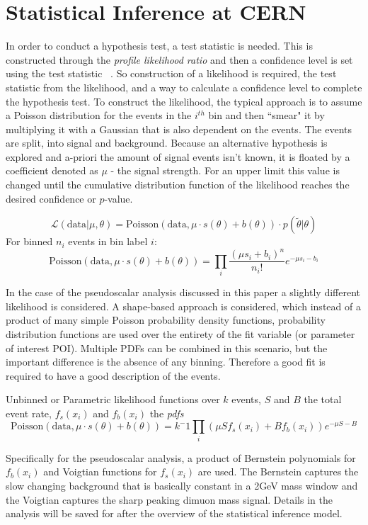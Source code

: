 \section{Statistical Inference at CERN}
In order to conduct a hypothesis test, a test statistic is needed. This is constructed through the \textit{profile likelihood ratio} and then a confidence level is set using the test statistic ~\cite{Cowan_2011}.
So construction of a likelihood is required, the test statistic from the likelihood, and a way to calculate a confidence level to complete the hypothesis test.
To construct the likelihood, the typical approach is to assume a Poisson distribution for the events in the $i^{th}$ bin and then ``smear" it by multiplying it with a Gaussian that is also dependent on the events. The events are split, into signal and background. Because an alternative hypothesis is explored and a-priori the amount of signal events isn't known, it is floated by a coefficient denoted as $\mu$ - the signal strength. For an upper limit this value is changed until the cumulative distribution function of the likelihood reaches the desired confidence or $p$-value.  

\[\mathcal{L}(\text{data}|\mu,\theta) = \text{Poisson}(\text{data},\mu\cdot s(\theta)+b(\theta)) \cdot p(\tilde{\theta}|\theta) \]
For binned $n_i$ events in bin label $i$:
\begin{equation}
\text{Poisson}(\text{data},\mu\cdot s(\theta)+b(\theta)) = \prod_i \frac{(\mu s_i+b_i)^n}{n_i !}e^{-\mu s_i -b_i}
\end{equation}

In the case of the pseudoscalar analysis discussed in this paper a slightly different likelihood is considered. A shape-based approach is considered, which instead of a product of many simple Poisson probability density functions, probability distribution functions are used over the entirety of the fit variable (or parameter of interest POI). Multiple PDFs can be combined in this scenario, but the important difference is the absence of any binning. Therefore a good fit is required to have a good description of the events.  

Unbinned or Parametric likelihood functions over $k$ events, $S$ and $B$ the total event rate, $f_s(x_i)$ and $f_b(x_i)$ the \textit{pdfs}
 \[\text{Poisson}(\text{data},\mu\cdot s(\theta)+b(\theta)) = k^-1 \prod_i(\mu S f_s(x_i) + B f_b(x_i))e^{-\mu S - B}\]

Specifically for the pseudoscalar analysis, a product of Bernstein polynomials for $f_b(x_i)$ and Voigtian functions for $f_s(x_i)$ are used. The Bernstein captures the slow changing background that is basically constant in a 2GeV mass window and the Voigtian captures the sharp peaking dimuon mass signal. Details in the analysis will be saved for after the overview of the statistical inference model. 

